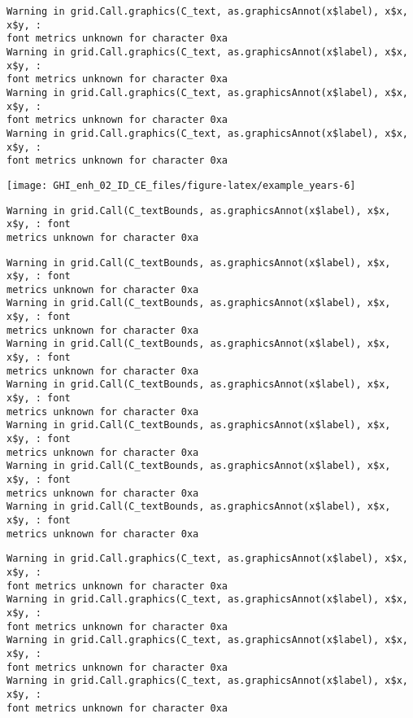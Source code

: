 \documentclass[
  10pt,
  a4paper,oneside]{article}
\begin{document}
\begin{verbatim}
Warning in grid.Call.graphics(C_text, as.graphicsAnnot(x$label), x$x, x$y, :
font metrics unknown for character 0xa
Warning in grid.Call.graphics(C_text, as.graphicsAnnot(x$label), x$x, x$y, :
font metrics unknown for character 0xa
Warning in grid.Call.graphics(C_text, as.graphicsAnnot(x$label), x$x, x$y, :
font metrics unknown for character 0xa
Warning in grid.Call.graphics(C_text, as.graphicsAnnot(x$label), x$x, x$y, :
font metrics unknown for character 0xa
\end{verbatim}

\begin{center}\texttt{[image: GHI\_enh\_02\_ID\_CE\_files/figure-latex/example\_years-6]} \end{center}

\begin{verbatim}
Warning in grid.Call(C_textBounds, as.graphicsAnnot(x$label), x$x, x$y, : font
metrics unknown for character 0xa
\end{verbatim}

\begin{verbatim}
Warning in grid.Call(C_textBounds, as.graphicsAnnot(x$label), x$x, x$y, : font
metrics unknown for character 0xa
Warning in grid.Call(C_textBounds, as.graphicsAnnot(x$label), x$x, x$y, : font
metrics unknown for character 0xa
Warning in grid.Call(C_textBounds, as.graphicsAnnot(x$label), x$x, x$y, : font
metrics unknown for character 0xa
Warning in grid.Call(C_textBounds, as.graphicsAnnot(x$label), x$x, x$y, : font
metrics unknown for character 0xa
Warning in grid.Call(C_textBounds, as.graphicsAnnot(x$label), x$x, x$y, : font
metrics unknown for character 0xa
Warning in grid.Call(C_textBounds, as.graphicsAnnot(x$label), x$x, x$y, : font
metrics unknown for character 0xa
Warning in grid.Call(C_textBounds, as.graphicsAnnot(x$label), x$x, x$y, : font
metrics unknown for character 0xa
\end{verbatim}

\begin{verbatim}
Warning in grid.Call.graphics(C_text, as.graphicsAnnot(x$label), x$x, x$y, :
font metrics unknown for character 0xa
Warning in grid.Call.graphics(C_text, as.graphicsAnnot(x$label), x$x, x$y, :
font metrics unknown for character 0xa
Warning in grid.Call.graphics(C_text, as.graphicsAnnot(x$label), x$x, x$y, :
font metrics unknown for character 0xa
Warning in grid.Call.graphics(C_text, as.graphicsAnnot(x$label), x$x, x$y, :
font metrics unknown for character 0xa
\end{verbatim}
\end{document}
